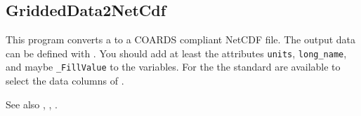 \clearpage
\subsection{GriddedData2NetCdf}\label{GriddedData2NetCdf}
This program converts a 
to a COARDS compliant NetCDF file. The output data can be defined with .
You should add at least the attributes \verb|units|, \verb|long_name|, and maybe \verb|_FillValue|
to the variables. For the  the standard 
are available to select the data columns of .

See also , , .



